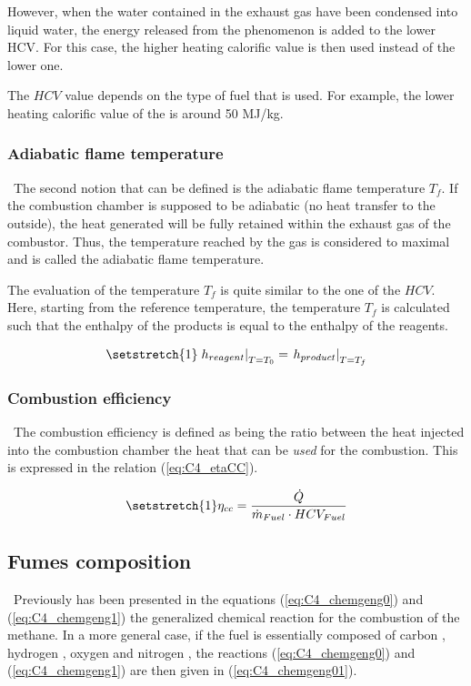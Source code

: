 However, when the water contained in the exhaust gas have been condensed into liquid water, the energy released from the phenomenon is added to the lower HCV. For this case, the higher heating calorific value is then used instead of the lower one.  

The \(HCV\) value depends on the type of fuel that is used. For example, the lower heating calorific value of the  is around 50 MJ/kg.

\subsubsection{Adiabatic flame temperature}
\quad\ The second notion that can be defined is the adiabatic flame temperature \(T_f\). If the combustion chamber is supposed to be adiabatic (no heat transfer to the outside), the heat generated will be fully retained within the exhaust gas of the combustor. Thus, the temperature reached by the gas is considered to maximal and is called the adiabatic flame temperature.

The evaluation of the temperature \(T_f\) is quite similar to the one of the \(HCV\). Here, starting from the reference temperature, the temperature \(T_f\) is calculated such that the enthalpy of the products is equal to the enthalpy of the reagents.

\begin{equation}
    \setstretch{1}
    \left.h_{reagent}\right|_{T=T_0} = \left.h_{product}\right|_{T=T_f}\label{eq:C4_T_f}
\end{equation}

\subsubsection{Combustion efficiency}
\quad\ The combustion efficiency is defined as being the ratio between the heat injected into the combustion chamber the heat that can be \textit{used} for the combustion. This is expressed in the relation (\ref{eq:C4_etaCC}).

\begin{equation}
    \setstretch{1}
    \eta_{cc} = \frac{\dot{Q}}{\dot{m}_{Fuel}\cdot HCV_{Fuel}}\label{eq:C4_etaCC}
\end{equation}
\subsection{Fumes composition}
\quad\ Previously has been presented in the equations (\ref{eq:C4_chemgeng0}) and (\ref{eq:C4_chemgeng1}) the generalized chemical reaction for the combustion of the methane.
In a more general case, if the fuel is essentially composed of carbon , hydrogen , oxygen  and nitrogen , the reactions (\ref{eq:C4_chemgeng0}) and (\ref{eq:C4_chemgeng1}) are then given in (\ref{eq:C4_chemgeng01}).

